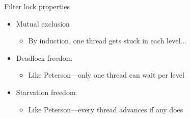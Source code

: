 \documentclass{beamer}
\begin{document}
\begin{frame}{Filter lock properties}
  \begin{itemize}
    \item Mutual exclusion
      \begin{itemize}
        \item By induction, one thread gets stuck in each level...
      \end{itemize}
    \item Deadlock freedom
      \begin{itemize}
        \item Like Peterson—only one thread can wait per level
      \end{itemize}
    \item Starvation freedom
      \begin{itemize}
        \item Like Peterson—every thread advances if any does
      \end{itemize}
  \end{itemize}
\end{frame}
\end{document}
